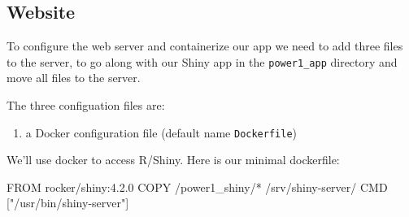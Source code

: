 \documentclass[
  letterpaper,
  DIV=11,
  numbers=noendperiod,
  oneside]{scrartcl}
\newenvironment{Shaded}{\begin{snugshade}}{\end{snugshade}}
\newcommand{\DecValTok}[1]{\textcolor[rgb]{0.68,0.00,0.00}{#1}}
\newcommand{\ErrorTok}[1]{\textcolor[rgb]{0.68,0.00,0.00}{#1}}
\newcommand{\FloatTok}[1]{\textcolor[rgb]{0.68,0.00,0.00}{#1}}
\newcommand{\NormalTok}[1]{\textcolor[rgb]{0.00,0.23,0.31}{#1}}
\newcommand{\SpecialCharTok}[1]{\textcolor[rgb]{0.37,0.37,0.37}{#1}}
\newcommand{\StringTok}[1]{\textcolor[rgb]{0.13,0.47,0.30}{#1}}
\providecommand{\tightlist}{%
  \setlength{\itemsep}{0pt}\setlength{\parskip}{0pt}}\usepackage{longtable,booktabs,array}
\begin{document}
\hypertarget{website}{%
\subsection{Website}\label{website}}

To configure the web server and containerize our app we need to add
three files to the server, to go along with our Shiny app in the
\texttt{power1\_app} directory and move all files to the server.

The three configuation files are:

\begin{enumerate}
\def\labelenumi{\arabic{enumi}.}
\tightlist
\item
  a Docker configuration file (default name \texttt{Dockerfile})
\end{enumerate}


We'll use docker to access R/Shiny. Here is our minimal dockerfile:

\begin{Shaded}
\begin{Highlighting}[]
\NormalTok{FROM rocker}\SpecialCharTok{/}\NormalTok{shiny}\SpecialCharTok{:}\DecValTok{4}\NormalTok{.}\FloatTok{2.0}
\NormalTok{COPY }\SpecialCharTok{/}\NormalTok{power1\_shiny}\SpecialCharTok{/}\ErrorTok{*} \ErrorTok{/}\NormalTok{srv}\SpecialCharTok{/}\NormalTok{shiny}\SpecialCharTok{{-}}\NormalTok{server}\SpecialCharTok{/}
\NormalTok{CMD [}\StringTok{"/usr/bin/shiny{-}server"}\NormalTok{]}
\end{Highlighting}
\end{Shaded}
\end{document}
